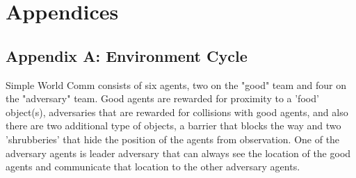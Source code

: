 \documentclass{article}
\begin{document}





\small

\normalsize
\newpage

\section*{Appendices}
\subsection*{Appendix A: Environment Cycle}

Simple World Comm consists of six agents, two on the "good" team and four on the "adversary" team.
Good agents are rewarded for proximity to a 'food' object(s), adversaries that are rewarded for collisions with good agents, and also there are two additional type of objects, a barrier that blocks the way and two 'shrubberies' that hide the position of the agents from observation.
One of the adversary agents is leader adversary that can always see the location of the good agents and communicate that location to the other adversary agents.
\end{document}
